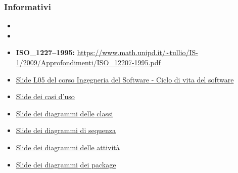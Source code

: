 \subsubsection{Informativi}
\begin{itemize}
	\item \PdPv{}
	\item \PdQv{}
	\item \textbf{ISO\_1227--1995:} \url{https://www.math.unipd.it/~tullio/IS-1/2009/Approfondimenti/ISO_12207-1995.pdf}
	\item \href{https://www.math.unipd.it/~tullio/IS-1/2020/Dispense/L05.pdf}{Slide L05 del corso Ingegneria del Software - Ciclo di vita del software}
	\item \href{https://www.math.unipd.it/~rcardin/swea/2021/Diagrammi%20Use%20Case_4x4.pdf}{Slide dei casi d'uso}
	\item \href{https://www.math.unipd.it/~rcardin/swea/2021/Diagrammi%20delle%20Classi_4x4.pdf}{Slide dei diagrammi delle classi}
	\item \href{https://www.math.unipd.it/~rcardin/swea/2021/Diagrammi%20di%20Sequenza_4x4.pdf}{Slide dei diagrammi di sequenza}
	\item \href{https://www.math.unipd.it/~rcardin/swea/2021/Diagrammi%20di%20Attivit%c3%a0_4x4.pdf}{Slide dei diagrammi delle attività}
	\item \href{https://www.math.unipd.it/~rcardin/swea/2021/Diagrammi%20dei%20Package_4x4.pdf}{Slide dei diagrammi dei package}
\end{itemize}